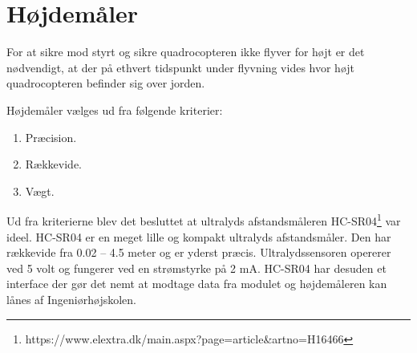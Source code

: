 \section{Højdemåler}

For at sikre mod styrt og sikre quadrocopteren ikke flyver for højt er det nødvendigt, at der på ethvert tidspunkt under flyvning vides hvor højt quadrocopteren befinder sig over jorden. 

Højdemåler vælges ud fra følgende kriterier:  
\begin{enumerate}[label*=\arabic*.]
	\item Præcision.
	\item Rækkevide. 
	\item Vægt. 
\end{enumerate}

\vspace{1cm}

Ud fra kriterierne blev det besluttet at ultralyds afstandsmåleren HC-SR04\footnote{https://www.elextra.dk/main.aspx?page=article&artno=H16466}  var ideel. HC-SR04 er en meget lille og kompakt ultralyds afstandsmåler. Den har rækkevide fra 0.02 – 4.5 meter og er yderst præcis. Ultralydssensoren opererer ved 5 volt og fungerer ved en strømstyrke på 2 mA. HC-SR04 har desuden et interface der gør det nemt at modtage data fra modulet og højdemåleren kan lånes af Ingeniørhøjskolen.

